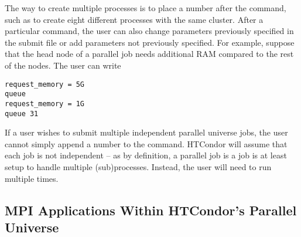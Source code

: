 The way to create multiple processes is to place a number after the 
command, such as  to create eight different processes with the 
same cluster. After a particular  command, the user can also change 
parameters previously specified in the submit file or add parameters not 
previously specified. For example, suppose that the head node of a parallel job 
needs additional RAM compared to the rest of the nodes. The user can write

\begin{verbatim}
request_memory = 5G
queue
request_memory = 1G
queue 31
\end{verbatim}

If a user wishes to submit multiple independent parallel universe jobs, the 
user cannot simply append a number to the  command. HTCondor will 
assume that each job is not independent -- as by definition, a parallel job is a 
job is at least setup to handle multiple (sub)processes. Instead, the user will
need to run  multiple times.




\subsection{\label{sec:parallel-mpi-submit}MPI Applications Within HTCondor's Parallel Universe}

